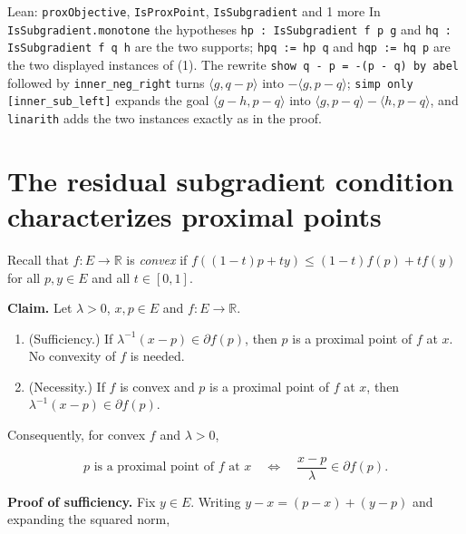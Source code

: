 \documentclass[11pt,a4paper]{article}
\begin{document}
\begin{leanbox}{Lean: \texttt{proxObjective}, \texttt{IsProxPoint}, \texttt{IsSubgradient} and 1 more}
In \texttt{Is\allowbreak{}Subgradient.\allowbreak{}monotone} the hypotheses \texttt{hp : Is\allowbreak{}Subgradient f p g} and \texttt{hq : Is\allowbreak{}Subgradient f q h} are the two supports; \texttt{hpq := hp q} and \texttt{hqp := hq p} are the two displayed instances of (1). The rewrite \texttt{show q -\allowbreak{} p = -\allowbreak{}(p -\allowbreak{} q) by abel} followed by \texttt{inner\_\allowbreak{}neg\_\allowbreak{}right} turns \(\langle g,q-p\rangle\) into \(-\langle g,p-q\rangle\); \texttt{simp only [inner\_\allowbreak{}sub\_\allowbreak{}left]} expands the goal \(\langle g-h,p-q\rangle\) into \(\langle g,p-q\rangle-\langle h,p-q\rangle\), and \texttt{linarith} adds the two instances exactly as in the proof.
\end{leanbox}

\section{\texorpdfstring{The residual subgradient condition characterizes proximal points}{The residual subgradient condition characterizes proximal points}}


Recall that \(f:E\to\mathbb R\) is \emph{convex} if \(f((1-t)p+ty)\le(1-t)f(p)+tf(y)\) for all \(p,y\in E\) and all \(t\in[0,1]\).




\textbf{Claim.} Let \(\lambda>0\), \(x,p\in E\) and \(f:E\to\mathbb R\).



\begin{enumerate}


\item (Sufficiency.) If \(\lambda^{-1}(x-p)\in\partial f(p)\), then \(p\) is a proximal point of \(f\) at \(x\). No convexity of \(f\) is needed.

\item (Necessity.) If \(f\) is convex and \(p\) is a proximal point of \(f\) at \(x\), then \(\lambda^{-1}(x-p)\in\partial f(p)\).

\end{enumerate}



Consequently, for convex \(f\) and \(\lambda>0\),


\[p\text{ is a proximal point of }f\text{ at }x\quad\Longleftrightarrow\quad\frac{x-p}{\lambda}\in\partial f(p).\]


\textbf{Proof of sufficiency.} Fix \(y\in E\). Writing \(y-x=(p-x)+(y-p)\) and expanding the squared norm,
\end{document}
